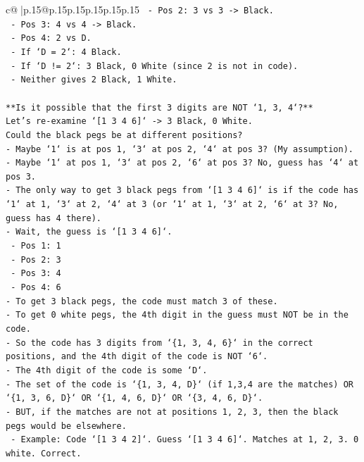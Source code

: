 \documentclass{article}
\begin{document}
{\begin{supertabular}{c@{$\;$}|p{.15\linewidth}@{}p{.15\linewidth}p{.15\linewidth}p{.15\linewidth}p{.15\linewidth}p{.15\linewidth}}
{{{\texttt{    {-} Pos 2: 3 vs 3 {-}> Black.} \\
\texttt{    {-} Pos 3: 4 vs 4 {-}> Black.} \\
\texttt{    {-} Pos 4: 2 vs D.} \\
\texttt{    {-} If `D = 2`: 4 Black.} \\
\texttt{    {-} If `D != 2`: 3 Black, 0 White (since 2 is not in code).} \\
\texttt{    {-} Neither gives 2 Black, 1 White.} \\
\\ 
\texttt{**Is it possible that the first 3 digits are NOT `1, 3, 4`?**} \\
\texttt{Let's re{-}examine `{[}1 3 4 6{]}` {-}> 3 Black, 0 White.} \\
\texttt{Could the black pegs be at different positions?} \\
\texttt{{-} Maybe `1` is at pos 1, `3` at pos 2, `4` at pos 3? (My assumption).} \\
\texttt{{-} Maybe `1` at pos 1, `3` at pos 2, `6` at pos 3? No, guess has `4` at pos 3.} \\
\texttt{{-} The only way to get 3 black pegs from `{[}1 3 4 6{]}` is if the code has `1` at 1, `3` at 2, `4` at 3 (or `1` at 1, `3` at 2, `6` at 3? No, guess has 4 there).} \\
\texttt{{-} Wait, the guess is `{[}1 3 4 6{]}`.} \\
\texttt{    {-} Pos 1: 1} \\
\texttt{    {-} Pos 2: 3} \\
\texttt{    {-} Pos 3: 4} \\
\texttt{    {-} Pos 4: 6} \\
\texttt{{-} To get 3 black pegs, the code must match 3 of these.} \\
\texttt{{-} To get 0 white pegs, the 4th digit in the guess must NOT be in the code.} \\
\texttt{{-} So the code has 3 digits from `\{1, 3, 4, 6\}` in the correct positions, and the 4th digit of the code is NOT `6`.} \\
\texttt{{-} The 4th digit of the code is some `D`.} \\
\texttt{{-} The set of the code is `\{1, 3, 4, D\}` (if 1,3,4 are the matches) OR `\{1, 3, 6, D\}` OR `\{1, 4, 6, D\}` OR `\{3, 4, 6, D\}`.} \\
\texttt{{-} BUT, if the matches are not at positions 1, 2, 3, then the black pegs would be elsewhere.} \\
\texttt{    {-} Example: Code `{[}1 3 4 2{]}`. Guess `{[}1 3 4 6{]}`. Matches at 1, 2, 3. 0 white. Correct.} \\
}}}
\end{supertabular}}
\end{document}
